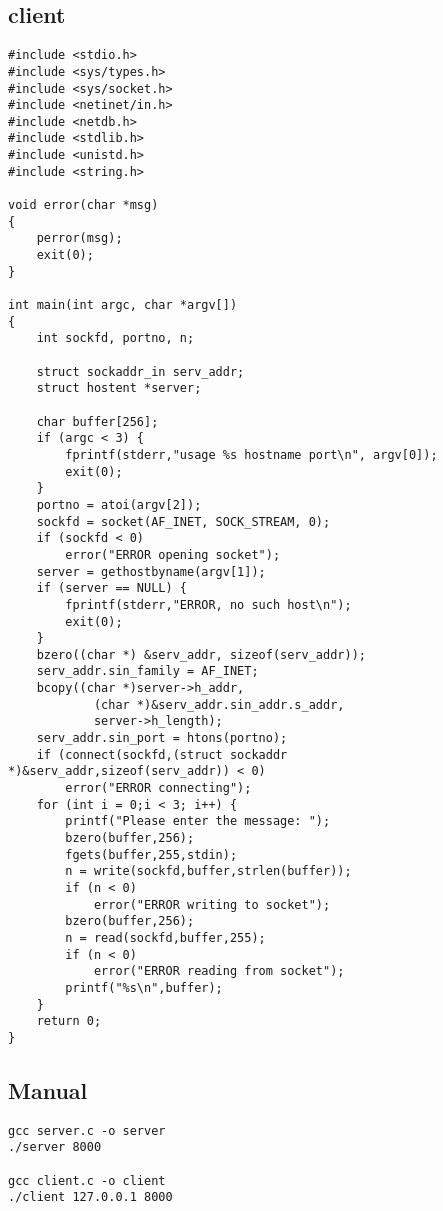 \documentclass[12pt]{article}
\begin{document}
\subsection{client}

\begin{lstlisting}
#include <stdio.h>
#include <sys/types.h>
#include <sys/socket.h>
#include <netinet/in.h>
#include <netdb.h> 
#include <stdlib.h>
#include <unistd.h>
#include <string.h>

void error(char *msg)
{
	perror(msg);
	exit(0);
}

int main(int argc, char *argv[])
{
	int sockfd, portno, n;

	struct sockaddr_in serv_addr;
	struct hostent *server;

	char buffer[256];
	if (argc < 3) {
		fprintf(stderr,"usage %s hostname port\n", argv[0]);
		exit(0);
	}
	portno = atoi(argv[2]);
	sockfd = socket(AF_INET, SOCK_STREAM, 0);
	if (sockfd < 0) 
		error("ERROR opening socket");
	server = gethostbyname(argv[1]);
	if (server == NULL) {
		fprintf(stderr,"ERROR, no such host\n");
		exit(0);
	}
	bzero((char *) &serv_addr, sizeof(serv_addr));
	serv_addr.sin_family = AF_INET;
	bcopy((char *)server->h_addr, 
			(char *)&serv_addr.sin_addr.s_addr,
			server->h_length);
	serv_addr.sin_port = htons(portno);
	if (connect(sockfd,(struct sockaddr *)&serv_addr,sizeof(serv_addr)) < 0) 
		error("ERROR connecting");
	for (int i = 0;i < 3; i++) {
		printf("Please enter the message: ");
		bzero(buffer,256);
		fgets(buffer,255,stdin);
		n = write(sockfd,buffer,strlen(buffer));
		if (n < 0) 
			error("ERROR writing to socket");
		bzero(buffer,256);
		n = read(sockfd,buffer,255);
		if (n < 0) 
			error("ERROR reading from socket");
		printf("%s\n",buffer);
	}
	return 0;
}
\end{lstlisting}

\subsection{Manual}

\begin{lstlisting}
gcc server.c -o server
./server 8000

gcc client.c -o client
./client 127.0.0.1 8000
\end{lstlisting}

\end{document}
